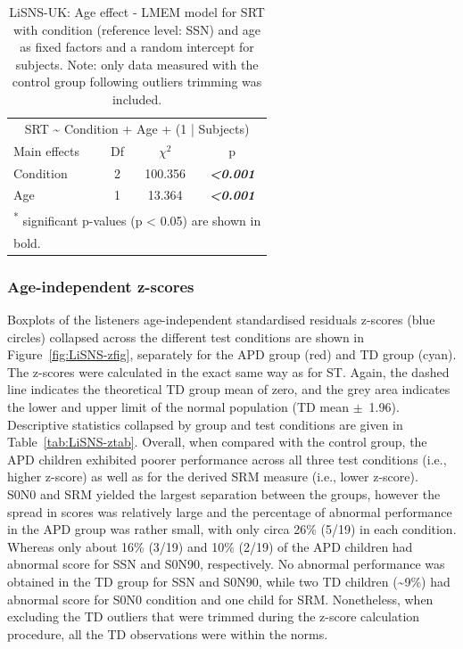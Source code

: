 \documentclass[a4paper, twoside]{templates/ociamthesis}
\begin{document}
\begin{table}

\caption{\label{tab:LiSNS-AgeLMEMTab}LiSNS-UK: Age effect - LMEM model for SRT with condition (reference level: SSN) and age as fixed factors and a random intercept for subjects. Note: only data measured with the control group following outliers trimming was included.}
\centering
\begin{tabular}[t]{lcc>{}c}
\toprule
\multicolumn{4}{c}{SRT \textasciitilde{} Condition + Age + (1 | Subjects)} \\
\cmidrule(l{3pt}r{3pt}){1-4}
Main effects & Df & $\chi^{2}$ & p\\
\midrule
Condition & 2 & 100.356 & \em{\textbf{<0.001}}\\
Age & 1 & 13.364 & \em{\textbf{<0.001}}\\
\bottomrule
\multicolumn{4}{l}{\textsuperscript{*} significant p-values (p < 0.05) are shown in}\\
\multicolumn{4}{l}{bold.}\\
\end{tabular}
\end{table}

\hypertarget{age-independent-z-scores-1}{%
\subsubsection*{Age-independent z-scores}\label{age-independent-z-scores-1}}

Boxplots of the listeners age-independent standardised residuals z-scores (blue circles) collapsed across the different test conditions are shown in Figure~\ref{fig:LiSNS-zfig}, separately for the APD group (red) and TD group (cyan). The z-scores were calculated in the exact same way as for ST. Again, the dashed line indicates the theoretical TD group mean of zero, and the grey area indicates the lower and upper limit of the normal population (TD mean \(\pm\)~1.96). Descriptive statistics collapsed by group and test conditions are given in Table~\ref{tab:LiSNS-ztab}. Overall, when compared with the control group, the APD children exhibited poorer performance across all three test conditions (i.e., higher z-score) as well as for the derived SRM measure (i.e., lower z-score).\\

S0N0 and SRM yielded the largest separation between the groups, however the spread in scores was relatively large and the percentage of abnormal performance in the APD group was rather small, with only circa 26\% (5/19) in each condition. Whereas only about 16\% (3/19) and 10\% (2/19) of the APD children had abnormal score for SSN and S0N90, respectively. No abnormal performance was obtained in the TD group for SSN and S0N90, while two TD children (\textasciitilde9\%) had abnormal score for S0N0 condition and one child for SRM. Nonetheless, when excluding the TD outliers that were trimmed during the z-score calculation procedure, all the TD observations were within the norms.\\
\end{document}
